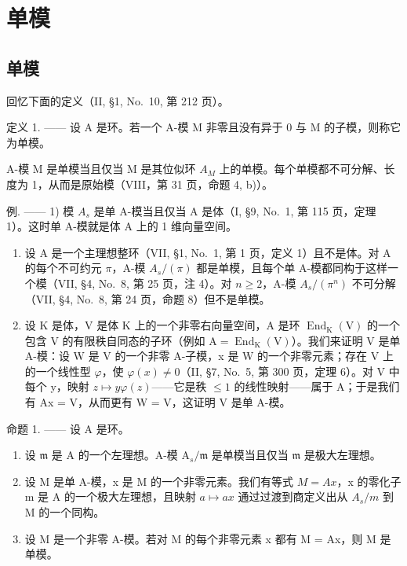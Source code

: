 \section{单模}

\subsection{单模}

回忆下面的定义（II, §1, No.~10, 第 212 页）。

定义 1. —— 设 A 是环。若一个 A-模 M 非零且没有异于 0 与 M 的子模，则称它为单模。

A-模 M 是单模当且仅当 M 是其位似环 \(A_{M}\) 上的单模。每个单模都不可分解、长度为 1，从而是原始模（VIII，第 31 页，命题 4, b)）。

例. —— 1) 模 \(A_{s}\) 是单 A-模当且仅当 A 是体（I, §9, No.~1, 第 115 页，定理 1）。这时单 A-模就是体 A 上的 1 维向量空间。

\begin{enumerate}
\def\labelenumi{\arabic{enumi})}
\setcounter{enumi}{1}
\item
  设 A 是一个主理想整环（VII, §1, No.~1, 第 1 页，定义 1）且不是体。对 A 的每个不可约元 \(\pi\)，A-模 \(A_s / (\pi)\) 都是单模，且每个单 A-模都同构于这样一个模（VII, §4, No.~8, 第 25 页，注 4）。对 \(n \geqslant 2\)，A-模 \(A_s / (\pi^n)\) 不可分解（VII, §4, No.~8, 第 24 页，命题 8）但不是单模。
\item
  设 K 是体，V 是体 K 上的一个非零右向量空间，A 是环 \(\operatorname{End}_{\mathrm{K}}(\mathrm{V})\) 的一个包含 V 的有限秩自同态的子环（例如 \(\mathrm{A} = \operatorname{End}_{\mathrm{K}}(\mathrm{V})\)）。我们来证明 V 是单 A-模：设 W 是 V 的一个非零 A-子模，x 是 W 的一个非零元素；存在 V 上的一个线性型 \(\varphi\)，使 \(\varphi(x) \neq 0\)（II, §7, No.~5, 第 300 页，定理 6）。对 V 中每个 y，映射 \(z \mapsto y\varphi(z)\)——它是秩 \(\leqslant 1\) 的线性映射——属于 A；于是我们有 Ax = V，从而更有 W = V，这证明 V 是单 A-模。
\end{enumerate}

命题 1. —— 设 A 是环。

\begin{enumerate}
\def\labelenumi{\alph{enumi})}
\item
  设 \(\mathfrak{m}\) 是 A 的一个左理想。A-模 \(\mathrm{A}_s / \mathfrak{m}\) 是单模当且仅当 \(\mathfrak{m}\) 是极大左理想。
\item
  设 M 是单 A-模，x 是 M 的一个非零元素。我们有等式 \(M = Ax\)，x 的零化子 m 是 A 的一个极大左理想，且映射 \(a \mapsto ax\) 通过过渡到商定义出从 \(A_{s}/m\) 到 M 的一个同构。
\item
  设 M 是一个非零 A-模。若对 M 的每个非零元素 x 都有 M = Ax，则 M 是单模。
\end{enumerate}

